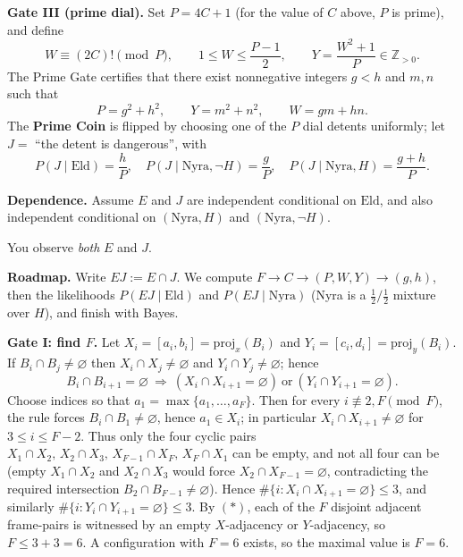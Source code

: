 \medskip
\noindent\textbf{Gate III (prime dial).}
Set \(P=4C+1\) (for the value of \(C\) above, \(P\) is prime), and define
\[
W\equiv (2C)!\pmod P,\qquad 1\le W\le \frac{P-1}{2},\qquad
Y=\frac{W^2+1}{P}\in\mathbb Z_{>0}.
\]
The Prime Gate certifies that there exist nonnegative integers \(g<h\) and \(m,n\) such that
\[
P=g^2+h^2,\qquad Y=m^2+n^2,\qquad W=gm+hn.
\]
The \textbf{Prime Coin} is flipped by choosing one of the \(P\) dial detents uniformly;
let \(J=\) “the detent is dangerous”, with
\[
P(J\mid\text{Eld})=\frac{h}{P},\quad
P(J\mid\text{Nyra},\neg H)=\frac{g}{P},\quad
P(J\mid\text{Nyra},H)=\frac{g+h}{P}.
\]

\medskip
\noindent\textbf{Dependence.}
Assume \(E\) and \(J\) are independent conditional on \(\text{Eld}\), and also independent conditional on
\((\text{Nyra},H)\) and \((\text{Nyra},\neg H)\).

\medskip
You observe \emph{both} \(E\) and \(J\).

\medskip
{}

\SolutionPage

\scriptsize

\textbf{Roadmap.} Write \(EJ:=E\cap J\). We compute \(F\to C\to(P,W,Y)\to(g,h)\), then the likelihoods
\(P(EJ\mid\text{Eld})\) and \(P(EJ\mid\text{Nyra})\) (Nyra is a \(\tfrac12/\tfrac12\) mixture over \(H\)),
and finish with Bayes.

\medskip
\textbf{Gate I: find \(F\).}
Let \(X_i=[a_i,b_i]=\mathrm{proj}_x(B_i)\) and \(Y_i=[c_i,d_i]=\mathrm{proj}_y(B_i)\).
If \(B_i\cap B_j\neq\varnothing\) then \(X_i\cap X_j\neq\varnothing\) and \(Y_i\cap Y_j\neq\varnothing\); hence
\[
B_i\cap B_{i+1}=\varnothing \ \Rightarrow\ (X_i\cap X_{i+1}=\varnothing)\ \text{or}\ (Y_i\cap Y_{i+1}=\varnothing).
\tag{$\ast$}
\]
Choose indices so that \(a_1=\max\{a_1,\dots,a_F\}\). Then for every \(i\not\equiv 2,F\pmod F\),
the rule forces \(B_i\cap B_1\neq\varnothing\), hence \(a_1\in X_i\); in particular
\(X_i\cap X_{i+1}\neq\varnothing\) for \(3\le i\le F-2\).
Thus only the four cyclic pairs
\(X_1\cap X_2,\,X_2\cap X_3,\,X_{F-1}\cap X_F,\,X_F\cap X_1\) can be empty, and not all four can be
(empty \(X_1\cap X_2\) and \(X_2\cap X_3\) would force \(X_2\cap X_{F-1}=\varnothing\), contradicting the
required intersection \(B_2\cap B_{F-1}\neq\varnothing\)).
Hence \(\#\{i: X_i\cap X_{i+1}=\varnothing\}\le 3\), and similarly \(\#\{i: Y_i\cap Y_{i+1}=\varnothing\}\le 3\).
By \((\ast)\), each of the \(F\) disjoint adjacent frame-pairs is witnessed by an empty \(X\)-adjacency or \(Y\)-adjacency, so
$
F\le 3+3=6.
$
A configuration with \(F=6\) exists, so the maximal value is \(F=6\).

